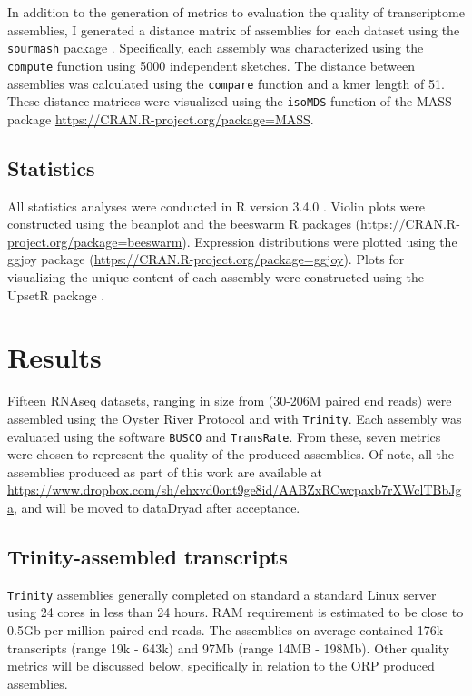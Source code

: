 \documentclass[10pt,letterpaper]{article}
\begin{document}
In addition to the generation of metrics to evaluation the quality of transcriptome assemblies, I generated a distance matrix of assemblies for each dataset using the \texttt{sourmash} package \citep{TitusBrown:2016jg}. Specifically, each assembly was characterized using the \texttt{compute} function using 5000 independent sketches. The distance between assemblies was calculated using the \texttt{compare} function and a kmer length of 51. These distance matrices were visualized using the \texttt{isoMDS} function of the MASS package \url{https://CRAN.R-project.org/package=MASS}. 

\subsection{Statistics}

All statistics analyses were conducted in R version 3.4.0 \citep{RALanguageandEn:wf}. Violin plots were constructed using the beanplot \citep{Kampstra:2008vc} and the beeswarm R packages (\url{https://CRAN.R-project.org/package=beeswarm}). Expression distributions were plotted using the ggjoy package (\url{https://CRAN.R-project.org/package=ggjoy}). Plots for visualizing the unique content of each assembly were constructed using the UpsetR package \citep{Conway:2017in}.  

\section{Results}

Fifteen RNAseq datasets, ranging in size from (30-206M paired end reads) were assembled using the Oyster River Protocol and with \texttt{Trinity}. Each assembly was evaluated using the software \texttt{BUSCO} and \texttt{TransRate}. From these, seven metrics were chosen to represent the quality of the produced assemblies. Of note, all the assemblies produced as part of this work are available at \url{https://www.dropbox.com/sh/ehxvd0ont9ge8id/AABZxRCwcpaxb7rXWclTBbJga}, and will be moved to dataDryad after acceptance. 

\subsection{Trinity-assembled transcripts} 

\texttt{Trinity} assemblies generally completed on standard a standard Linux server using 24 cores in less than 24 hours. RAM requirement is estimated to be close to 0.5Gb per million paired-end reads. The assemblies on average contained 176k transcripts (range 19k - 643k) and 97Mb (range 14MB - 198Mb). Other quality metrics will be discussed below, specifically in relation to the ORP produced assemblies.  
\end{document}
